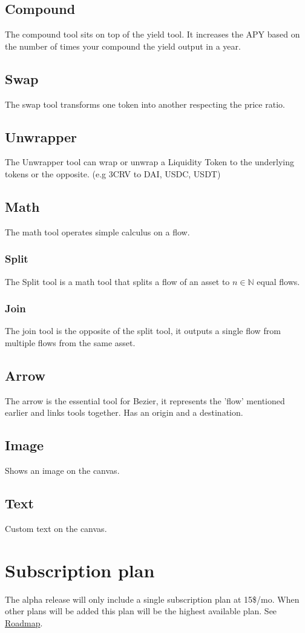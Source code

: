 \documentclass{article}
\begin{document}
\subsection{Compound}
The compound tool sits on top of the yield tool. It increases the APY based on the number of times your compound the yield output in a year.
\subsection{Swap}
The swap tool transforms one token into another respecting the price ratio.
\subsection{Unwrapper}
The Unwrapper tool can wrap or unwrap a Liquidity Token to the underlying tokens or the opposite. (e.g 3CRV to DAI, USDC, USDT)
\subsection{Math}
The math tool operates simple calculus on a flow.
\subsubsection{Split}
The Split tool is a math tool that splits a flow of an asset to $n \in \mathbb{N}$ equal flows.
\subsubsection{Join}
The join tool is the opposite of the split tool, it outputs a single flow from multiple flows from the same asset.
\subsection{Arrow}
The arrow is the essential tool for Bezier, it represents the 'flow' mentioned earlier and links tools together. Has an origin and a destination.
\subsection{Image}
Shows an image on the canvas.
\subsection{Text}
Custom text on the canvas.
\section{Subscription plan}
The alpha release will only include a single subscription plan at 15\$/mo. When other plans will be added this plan will be the highest available plan. See \hyperref[sec:roadmap]{Roadmap}.
\end{document}
